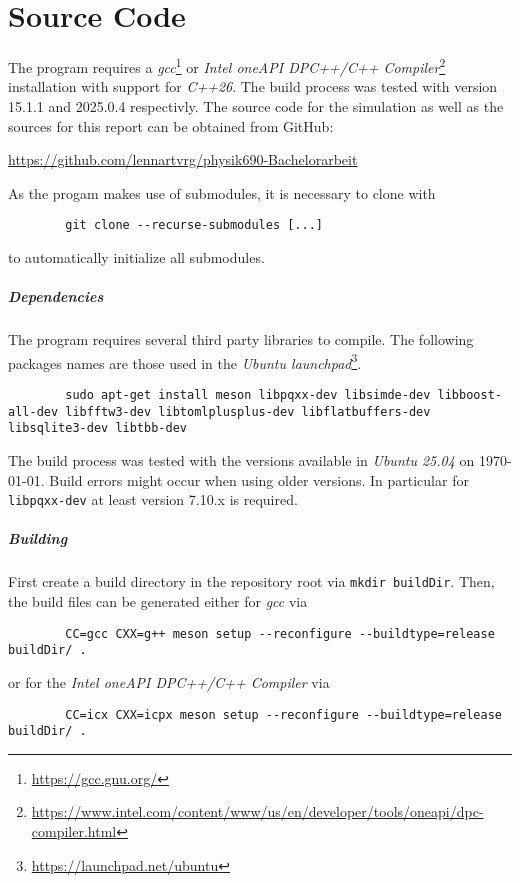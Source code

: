 \chapter{Source Code}\label{chap:source_code}
	The program requires a \emph{gcc}\footnote{\url{https://gcc.gnu.org/}} or \emph{Intel\textsuperscript{\tiny\textregistered} oneAPI DPC++/C++ Compiler}\footnote{\url{https://www.intel.com/content/www/us/en/developer/tools/oneapi/dpc-compiler.html}} installation with support for \emph{C++26}. The build process was tested with version 15.1.1 and 2025.0.4 respectivly. The source code for the simulation as well as the sources for this report can be obtained from GitHub:
	\begin{center}
		\url{https://github.com/lennartvrg/physik690-Bachelorarbeit}
	\end{center}
	As the progam makes use of submodules, it is necessary to clone with 
	\begin{verbatim}
		git clone --recurse-submodules [...]
	\end{verbatim}
	to automatically initialize all submodules.
	
	\paragraph{Dependencies}
	The program requires several third party libraries to compile. The following packages names are those used in the \emph{Ubuntu launchpad}\footnote{\url{https://launchpad.net/ubuntu}}.
	\begin{verbatim}
		sudo apt-get install meson libpqxx-dev libsimde-dev libboost-all-dev libfftw3-dev libtomlplusplus-dev libflatbuffers-dev libsqlite3-dev libtbb-dev
	\end{verbatim}
	The build process was tested with the versions available in \emph{Ubuntu 25.04} on \today. Build errors might occur when using older versions. In particular for \texttt{libpqxx-dev} at least version 7.10.x is required.
	
	\paragraph{Building}
	First create a build directory in the repository root via \texttt{mkdir buildDir}. Then, the build files can be generated either for \emph{gcc} via
	\begin{verbatim}
		CC=gcc CXX=g++ meson setup --reconfigure --buildtype=release buildDir/ .
	\end{verbatim}
	or for the \emph{Intel\textsuperscript{\tiny\textregistered} oneAPI DPC++/C++ Compiler} via
	\begin{verbatim}
		CC=icx CXX=icpx meson setup --reconfigure --buildtype=release buildDir/ .
	\end{verbatim}